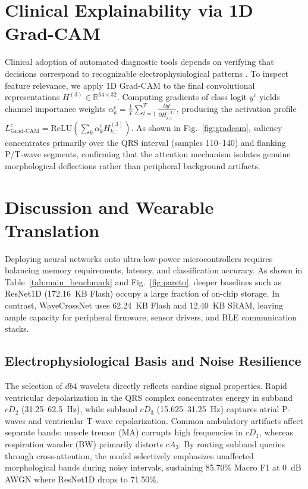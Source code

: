 \documentclass[conference]{IEEEtran}
\begin{document}
\section{Clinical Explainability via 1D Grad-CAM}
\label{sec:xai}

Clinical adoption of automated diagnostic tools depends on verifying that decisions correspond to recognizable electrophysiological patterns \cite{selvaraju2017grad}. To inspect feature relevance, we apply 1D Grad-CAM to the final convolutional representations $H^{(3)} \in \mathbb{R}^{64 \times 32}$. Computing gradients of class logit $y^c$ yields channel importance weights $\alpha_k^c = \frac{1}{T} \sum_{t=1}^{T} \frac{\partial y^c}{\partial H^{(3)}_{k, t}}$, producing the activation profile $L_{\text{Grad-CAM}}^c = \mathrm{ReLU}(\sum_{k} \alpha_k^c H^{(3)}_{k, :})$. As shown in Fig.~\ref{fig:gradcam}, saliency concentrates primarily over the QRS interval (samples 110--140) and flanking P/T-wave segments, confirming that the attention mechanism isolates genuine morphological deflections rather than peripheral background artifacts.


\section{Discussion and Wearable Translation}
\label{sec:discussion}

Deploying neural networks onto ultra-low-power microcontrollers requires balancing memory requirements, latency, and classification accuracy. As shown in Table~\ref{tab:main_benchmark} and Fig.~\ref{fig:pareto}, deeper baselines such as ResNet1D (172.16~KB Flash) occupy a large fraction of on-chip storage. In contrast, WaveCrossNet uses 62.24~KB Flash and 12.40~KB SRAM, leaving ample capacity for peripheral firmware, sensor drivers, and BLE communication stacks.

\subsection{Electrophysiological Basis and Noise Resilience}
The selection of $db4$ wavelets directly reflects cardiac signal properties. Rapid ventricular depolarization in the QRS complex concentrates energy in subband $cD_2$ (31.25--62.5~Hz), while subband $cD_3$ (15.625--31.25~Hz) captures atrial P-waves and ventricular T-wave repolarization. Common ambulatory artifacts affect separate bands: muscle tremor (MA) corrupts high frequencies in $cD_1$, whereas respiration wander (BW) primarily distorts $cA_3$. By routing subband queries through cross-attention, the model selectively emphasizes unaffected morphological bands during noisy intervals, sustaining 85.70\% Macro F1 at 0~dB AWGN where ResNet1D drops to 71.50\%.
\end{document}
